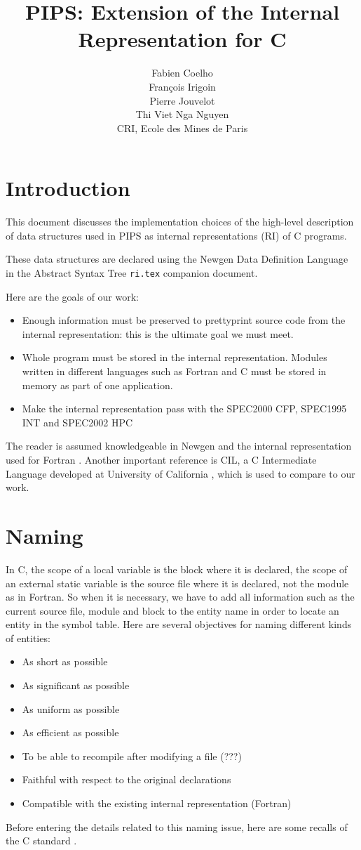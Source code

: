 \documentclass[a4paper]{report}
\title{PIPS: Extension of the Internal Representation for C}
\author{
  Fabien Coelho \\
  Fran\c{c}ois Irigoin \\
  Pierre Jouvelot \\
  Thi Viet Nga Nguyen \\
  CRI, Ecole des Mines de Paris}
\begin{document}
\noindent
\maketitle
\tableofcontents


\chapter*{Introduction}

This document discusses the implementation choices of the high-level
description of data structures used in PIPS as internal representations
(RI) of C programs.

These data structures are declared using the Newgen Data Definition
Language in the Abstract Syntax Tree \texttt{ri.tex} companion document.

Here are the goals of our work:
\begin{itemize}
\item Enough information
must be preserved to prettyprint source code from the internal
representation: this is the ultimate goal we must meet. 
\item Whole program must be stored in the internal representation. Modules written in different languages such as
Fortran and C must be stored in memory as part of one application.
\item Make the internal representation pass with the SPEC2000 CFP, SPEC1995 INT and SPEC2002 HPC
\end{itemize}
The reader is assumed knowledgeable in Newgen \cite{Jouv90} and the internal
representation used for Fortran \cite{Coel01}. Another important reference
is CIL, a C Intermediate Language developed at University of California
\cite{Necu02}, which is used to compare to our work. 


\chapter{Naming}

In C, the scope of a local variable is the
block where it is declared, the scope of an external static variable is
the source file where it is declared, not the module as in Fortran. So when it is
necessary, we have to add all information
such as the current source file, module and block to the entity name in order to locate an
entity in the symbol table. Here are several objectives for naming
different kinds of entities:
\begin{itemize}
\item As short as possible
\item As significant as possible
\item As uniform as possible
\item As efficient as possible
\item To be able to recompile after modifying a file (???)
\item Faithful with respect to the original declarations 
\item Compatible with the existing internal representation (Fortran)  
\end{itemize}
Before entering the details related to this naming issue, here are some
recalls of the C standard \cite{ISOC}.
\end{document}
